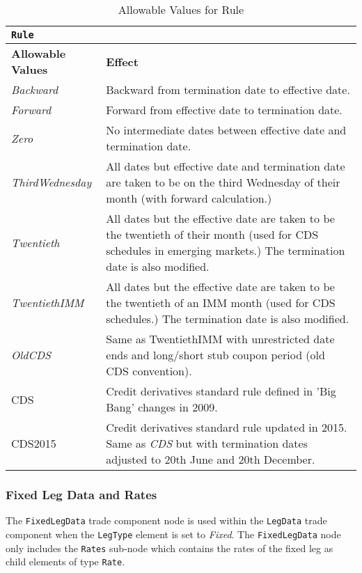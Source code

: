 \begin{table}[H]
\centering
\begin{tabular}{|l|p{6cm}|}
\hline
\multicolumn{2}{|l|}{\lstinline!Rule!}                    \\ \hline
\textbf{Allowable Values}                   & \textbf{Effect}                       \\ \hline
\emph{Backward}   &   Backward from termination date to effective date.   \\ \hline
\emph{Forward}   &   Forward from effective date to termination date.  \\ \hline
\emph{Zero}   &   No intermediate dates between effective date and termination date.  \\ \hline
\emph{ThirdWednesday}   &   All dates but effective date and
                          termination date are taken to be on the
                          third Wednesday of their month (with forward calculation.) \\ \hline
\emph{Twentieth}   &   All dates but the effective date are taken to be the twentieth of their month (used for CDS schedules in emerging markets.)  The termination date is also modified. \\ \hline
\emph{TwentiethIMM}   &   All dates but the effective date are  taken to be the twentieth of an IMM month (used for CDS schedules.)  The termination date is also modified. \\ \hline
\emph{OldCDS}   &   Same as TwentiethIMM with unrestricted date ends and long/short stub coupon period (old CDS convention).\\ \hline
CDS   &   Credit derivatives standard rule defined in 'Big Bang' changes in 2009. \\ \hline
CDS2015   &   Credit derivatives standard rule updated in 2015. Same as  \emph{CDS} but with termination dates adjusted to 20th June and 20th December. \\ \hline
\end{tabular}
  \caption{Allowable Values for Rule}
  \label{tab:rule}
\end{table}

\subsubsection{Fixed Leg Data and Rates}
\label{ss:fixedleg_data}

The \lstinline!FixedLegData! trade component node is used within the \lstinline!LegData! trade component when the
\lstinline!LegType! element is set to \emph{Fixed}. The \lstinline!FixedLegData! node only includes the
\lstinline!Rates! sub-node which contains the rates of the fixed leg as child elements of type \lstinline!Rate!.

